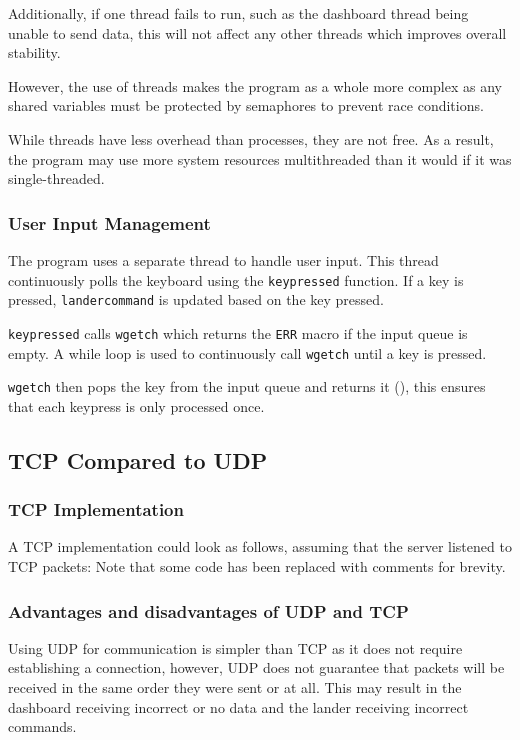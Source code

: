 \documentclass{article}
\newcommand{\code}[1]{\texttt{#1}}
\begin{document}
{        Additionally, if one thread fails to run, such as the dashboard thread being unable to send data,
        this will not affect any other threads which improves overall stability.

        However, the use of threads makes the program as a whole more complex as any shared variables
        must be protected by semaphores to prevent race conditions.

        While threads have less overhead than processes, they are not free. As a result, the program may
        use more system resources multithreaded than it would if it was single-threaded.

        \subsubsection{User Input Management}
        The program uses a separate thread to handle user input. This thread continuously polls
        the keyboard using the \code{key\textunderscore pressed} function. If a key is pressed,
        \code{landercommand} is updated based on the key pressed.

        \code{key\textunderscore pressed} calls \code{wgetch} which returns the \code{ERR} macro if
        the input queue is empty. A while loop is used to continuously call \code{wgetch} until a key
        is pressed.

        \code{wgetch} then pops the key from the input queue and returns it (\cite{linux_manual_wgetch3_nodate}),
        this ensures that each keypress is only processed once.

    \subsection{TCP Compared to UDP}
    \subsubsection{TCP Implementation}
    A TCP implementation could look as follows, assuming that the server
    listened to TCP packets:
    Note that some code has been replaced with comments for brevity.

    

    \subsubsection{Advantages and disadvantages of UDP and TCP}
    Using UDP for communication is simpler than TCP as it does not require establishing a connection,
    however, UDP does not guarantee that packets will be received in the same
    order they were sent or at all. This may result in the dashboard receiving
    incorrect or no data and the lander receiving incorrect commands.

}
\end{document}
